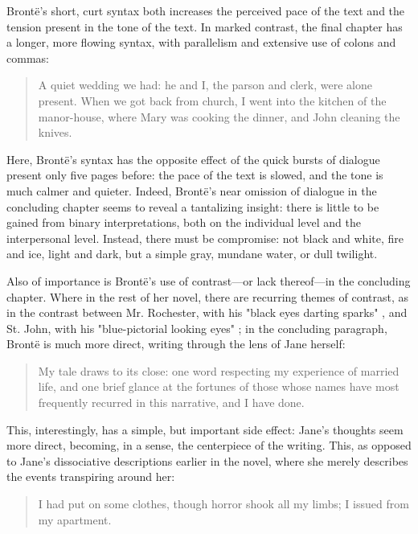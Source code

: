 \documentclass[a4paper,12pt]{article}
\begin{document}
\begin{flushleft}
\begin{quote}
            \cite[516]{brontec}
        \end{quote}
        Brontë’s short, curt syntax both increases the perceived pace of the text and the tension
        present in the tone of the text. In marked contrast, the final chapter has a longer, more
        flowing syntax, with parallelism and extensive use of colons and commas:
        \begin{quote}
            A quiet wedding we had: he and I, the parson and clerk, were alone present. When we got
            back from church, I went into the kitchen of the manor-house, where Mary was cooking the
            dinner, and John cleaning the knives.
            
            \cite[521]{brontec}
        \end{quote}
        Here, Brontë’s syntax has the opposite effect of the quick bursts of dialogue present only
        five pages before: the pace of the text is slowed, and the tone is much calmer and quieter.
        Indeed, Brontë’s near omission of dialogue in the concluding chapter seems to reveal a
        tantalizing insight: there is little to be gained from binary interpretations, both on the
        individual level and the interpersonal level. Instead, there must be compromise: not black
        and white, fire and ice, light and dark, but a simple gray, mundane water, or dull twilight.

        Also of importance is Brontë’s use of contrast—or lack thereof—in the concluding chapter.
        Where in the rest of her novel, there are recurring themes of contrast, as in the contrast
        between Mr. Rochester, with his "black eyes darting sparks" \cite[236]{brontec}, and St. John, with
        his "blue-pictorial looking eyes" \cite[399]{brontec}; in the concluding paragraph, Brontë is much
        more direct, writing through the lens of Jane herself:
        \begin{quote}
            My tale draws to its close: one word respecting my experience of married life, and one
            brief glance at the fortunes of those whose names have most frequently recurred in this
            narrative, and I have done.
            
            \cite[523]{brontec}
        \end{quote}
        This, interestingly, has a simple, but important side effect: Jane’s thoughts seem more
        direct, becoming, in a sense, the centerpiece of the writing. This, as opposed to Jane’s
        dissociative descriptions earlier in the novel, where she merely describes the events
        transpiring around her:
        \begin{quote}
            I had put on some clothes, though horror shook all my limbs; I issued from my apartment.


\end{quote}
\end{flushleft}
\end{document}
